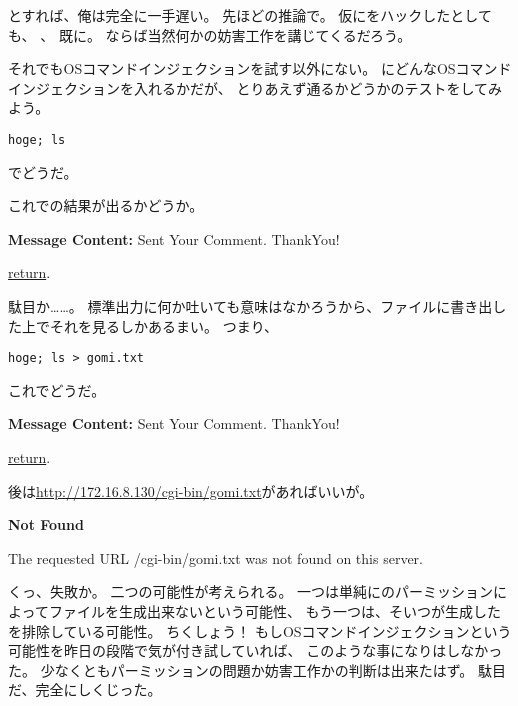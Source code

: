 とすれば、俺は完全に一手遅い。
先ほどの推論で。
仮にをハックしたとしても、
、
既に。
ならば当然何かの妨害工作を講じてくるだろう。

それでもOSコマンドインジェクションを試す以外にない。
にどんなOSコマンドインジェクションを入れるかだが、
とりあえず通るかどうかのテストをしてみよう。

\begin{lstlisting}
hoge; ls
\end{lstlisting}

でどうだ。

これでの結果が出るかどうか。

\begin{itembox}[c]{\textbf{Message Content:}}
Sent Your Comment. ThankYou!

\underline{return}. 
\end{itembox}

駄目か……。
標準出力に何か吐いても意味はなかろうから、ファイルに書き出した上でそれを見るしかあるまい。
つまり、

\begin{lstlisting}
hoge; ls > gomi.txt
\end{lstlisting}

これでどうだ。

\begin{itembox}[c]{\textbf{Message Content:}}
Sent Your Comment. ThankYou!

\underline{return}. 
\end{itembox}

後は\url{http://172.16.8.130/cgi-bin/gomi.txt}があればいいが。

\begin{itembox}[c]{\textbf{Not Found}}

The requested URL /cgi-bin/gomi.txt was not found on this server.
\end{itembox}

くっ、失敗か。
二つの可能性が考えられる。
一つは単純にのパーミッションによってファイルを生成出来ないという可能性、
もう一つは、そいつが生成したを排除している可能性。
ちくしょう！
もしOSコマンドインジェクションという可能性を昨日の段階で気が付き試していれば、
このような事になりはしなかった。
少なくともパーミッションの問題か妨害工作かの判断は出来たはず。
駄目だ、完全にしくじった。

